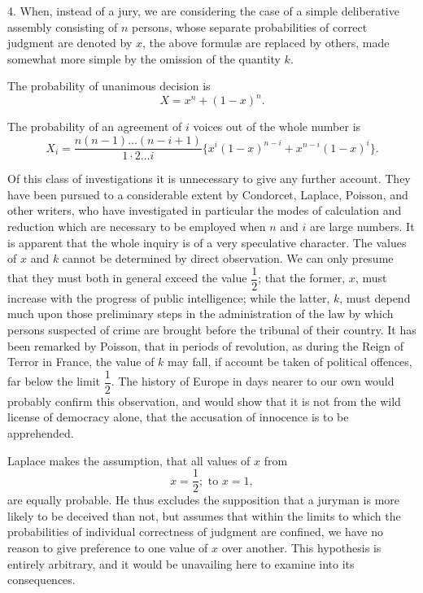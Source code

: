 \documentclass[oneside]{book}
\begin{document}
4. When, instead of a jury, we are considering the case of a
simple deliberative assembly consisting of $n$ persons, whose separate
probabilities of correct judgment are denoted by $x$, the above
{formul\ae} are replaced by others, made somewhat more simple by
the omission of the quantity $k$.

The probability of unanimous decision is
\begin{equation*}
X = x^n+(1-x)^n.
\end{equation*}

The probability of an agreement of $i$ voices out of the whole
number is
\begin{equation}\tag{4}
X_i = \frac{n(n-1)\dotsc (n-i+1)}{1 \cdot 2 \dotsc i} \{x^i(1-x)^{n-i}+x^{n-i}(1-x)^i\}.
\end{equation}

Of this class of investigations it is unnecessary to give any
further account. They have been pursued to a considerable extent
by Condorcet, Laplace, Poisson, and other writers, who
have investigated in particular the modes of calculation and reduction
which are necessary to be employed when $n$ and $i$ are
large numbers. It is apparent that the whole inquiry is of a very
speculative character. The values of $x$ and $k$ cannot be
determined by direct observation. We can only presume that they
must both in general exceed the value $\dfrac{1}{2}$; that the former, $x$, must
increase with the progress of public intelligence; while the latter,
$k$, must depend much upon those preliminary steps in the administration of the law by which persons suspected of crime are
brought before the tribunal of their country. It has been remarked by Poisson, that in periods of revolution, as during the
Reign of Terror in France, the value of $k$ may fall, if account be
taken of political offences, far below the limit $\dfrac{1}{2}$. The history of
Europe in days nearer to our own would probably confirm this
observation, and would show that it is not from the wild license
of democracy alone, that the accusation of innocence is to be
apprehended.

Laplace makes the assumption, that all values of $x$ from
\[
  x = \frac{1}{2}; \text{ to }x = 1,
\]
are equally probable. He thus excludes the supposition that a
juryman is more likely to be deceived than not, but assumes that
within the limits to which the probabilities of individual correctness of judgment are confined, we have no reason to give
preference to one value of $x$ over another. This hypothesis is
entirely arbitrary, and it would be unavailing here to examine
into its consequences.
\end{document}
